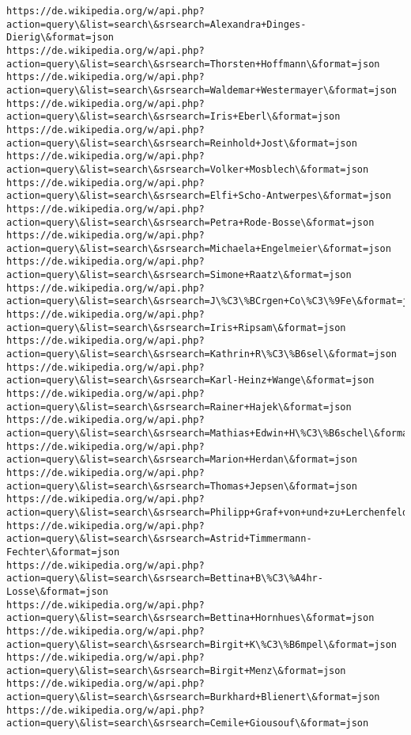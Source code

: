 \documentclass[11pt]{article}
\begin{document}
\begin{Verbatim}[commandchars=\\\{\}]
https://de.wikipedia.org/w/api.php?action=query\&list=search\&srsearch=Alexandra+Dinges-Dierig\&format=json
https://de.wikipedia.org/w/api.php?action=query\&list=search\&srsearch=Thorsten+Hoffmann\&format=json
https://de.wikipedia.org/w/api.php?action=query\&list=search\&srsearch=Waldemar+Westermayer\&format=json
https://de.wikipedia.org/w/api.php?action=query\&list=search\&srsearch=Iris+Eberl\&format=json
https://de.wikipedia.org/w/api.php?action=query\&list=search\&srsearch=Reinhold+Jost\&format=json
https://de.wikipedia.org/w/api.php?action=query\&list=search\&srsearch=Volker+Mosblech\&format=json
https://de.wikipedia.org/w/api.php?action=query\&list=search\&srsearch=Elfi+Scho-Antwerpes\&format=json
https://de.wikipedia.org/w/api.php?action=query\&list=search\&srsearch=Petra+Rode-Bosse\&format=json
https://de.wikipedia.org/w/api.php?action=query\&list=search\&srsearch=Michaela+Engelmeier\&format=json
https://de.wikipedia.org/w/api.php?action=query\&list=search\&srsearch=Simone+Raatz\&format=json
https://de.wikipedia.org/w/api.php?action=query\&list=search\&srsearch=J\%C3\%BCrgen+Co\%C3\%9Fe\&format=json
https://de.wikipedia.org/w/api.php?action=query\&list=search\&srsearch=Iris+Ripsam\&format=json
https://de.wikipedia.org/w/api.php?action=query\&list=search\&srsearch=Kathrin+R\%C3\%B6sel\&format=json
https://de.wikipedia.org/w/api.php?action=query\&list=search\&srsearch=Karl-Heinz+Wange\&format=json
https://de.wikipedia.org/w/api.php?action=query\&list=search\&srsearch=Rainer+Hajek\&format=json
https://de.wikipedia.org/w/api.php?action=query\&list=search\&srsearch=Mathias+Edwin+H\%C3\%B6schel\&format=json
https://de.wikipedia.org/w/api.php?action=query\&list=search\&srsearch=Marion+Herdan\&format=json
https://de.wikipedia.org/w/api.php?action=query\&list=search\&srsearch=Thomas+Jepsen\&format=json
https://de.wikipedia.org/w/api.php?action=query\&list=search\&srsearch=Philipp+Graf+von+und+zu+Lerchenfeld\&format=json
https://de.wikipedia.org/w/api.php?action=query\&list=search\&srsearch=Astrid+Timmermann-Fechter\&format=json
https://de.wikipedia.org/w/api.php?action=query\&list=search\&srsearch=Bettina+B\%C3\%A4hr-Losse\&format=json
https://de.wikipedia.org/w/api.php?action=query\&list=search\&srsearch=Bettina+Hornhues\&format=json
https://de.wikipedia.org/w/api.php?action=query\&list=search\&srsearch=Birgit+K\%C3\%B6mpel\&format=json
https://de.wikipedia.org/w/api.php?action=query\&list=search\&srsearch=Birgit+Menz\&format=json
https://de.wikipedia.org/w/api.php?action=query\&list=search\&srsearch=Burkhard+Blienert\&format=json
https://de.wikipedia.org/w/api.php?action=query\&list=search\&srsearch=Cemile+Giousouf\&format=json

\end{Verbatim}
\end{document}
